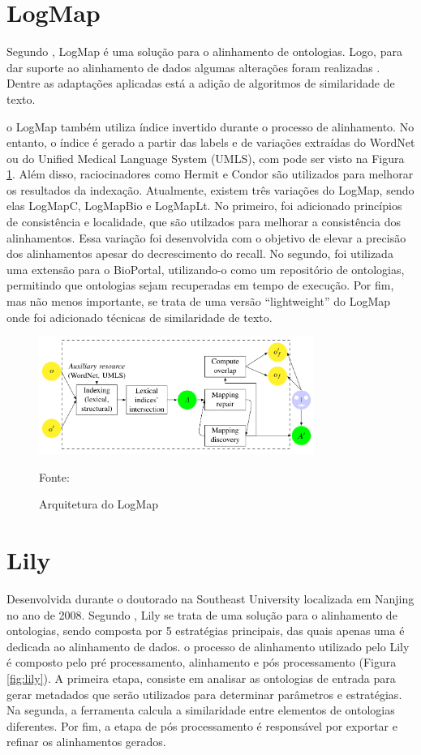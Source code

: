 \section*{LogMap}
Segundo , LogMap é uma solução para o alinhamento de ontologias. Logo, para dar suporte ao alinhamento de dados algumas alterações foram realizadas \cite{jimenez2015logmap}. Dentre as adaptações aplicadas está a adição de algoritmos de similaridade de texto.

o LogMap também utiliza índice invertido durante o processo de alinhamento. No entanto, o índice é gerado a partir das labels e de variações extraídas do WordNet ou do Unified Medical Language System (UMLS), com pode ser visto na Figura \ref{fig:logmap}. Além disso, raciocinadores como Hermit e Condor são utilizados para melhorar os resultados da indexação. 
Atualmente, existem três variações do LogMap, sendo elas LogMapC, LogMapBio e LogMapLt.  No primeiro, foi adicionado princípios de consistência e localidade, que são utilzados para melhorar a consistência dos alinhamentos. Essa variação foi desenvolvida com o objetivo de elevar a precisão dos alinhamentos apesar do decrescimento do recall. No segundo, foi utilizada uma extensão para o BioPortal, utilizando-o como um repositório de ontologias, permitindo que ontologias sejam recuperadas em tempo de execução. Por fim, mas não menos importante, se trata de uma versão “lightweight” do LogMap onde foi adicionado técnicas de similaridade de texto.

\begin{figure}[!ht]
	\centering
	\includegraphics[width=0.8\textwidth]{./imagens/logmap.png}
    \caption{Arquitetura do LogMap}
	\footnotesize{Fonte: \cite{euzenat2013d}}
	\label{fig:logmap}
\end{figure}

\section*{Lily}
Desenvolvida durante o doutorado na Southeast University localizada em Nanjing no ano de 2008. Segundo  , Lily se trata de uma solução para o alinhamento de ontologias, sendo composta por 5 estratégias principais, das quais apenas uma é dedicada ao alinhamento de dados.
o processo de alinhamento utilizado pelo Lily é composto pelo pré processamento, alinhamento e pós processamento (Figura \ref{fig:lily}).  A primeira etapa, consiste em analisar as ontologias de entrada para gerar metadados que serão utilizados para determinar parâmetros e estratégias. Na segunda, a ferramenta calcula a similaridade entre elementos de ontologias diferentes. Por fim, a etapa de pós processamento é responsável por exportar e refinar os alinhamentos gerados.

